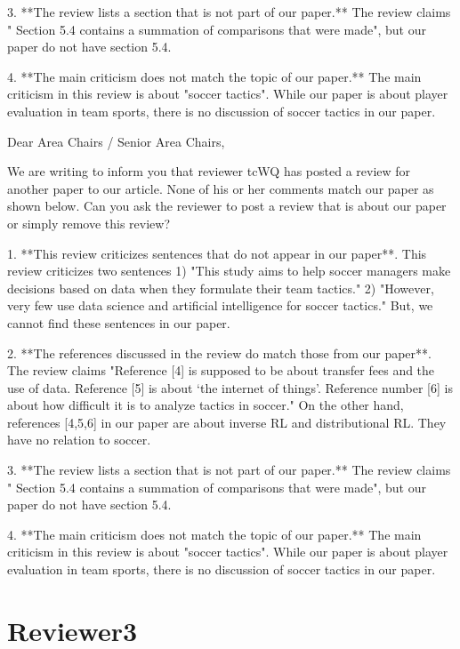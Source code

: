 \documentclass{article}
\begin{document}
3. **The review lists a section that is not part of our paper.** The review claims " Section 5.4 contains a summation of comparisons that were made", but our paper do not have section 5.4.

4. **The main criticism does not match the topic of  our paper.** The main criticism in this review is about "soccer tactics". While our paper is about player evaluation in team sports, there is no discussion of soccer tactics in our paper.

Dear Area Chairs / Senior Area Chairs,

We are writing to inform you that reviewer tcWQ has posted a review for another paper to our article. None of his or her comments match our paper as shown below.  Can you ask the reviewer to post a review that is about our paper or simply remove this review?

1. **This review criticizes sentences that do not appear in our paper**. This review criticizes two sentences 1) "This study aims to help soccer managers make decisions based on data when they formulate their team tactics." 2) "However, very few use data science and artificial intelligence for soccer tactics."  But, we cannot find these sentences in our paper.

2. **The references discussed in the review do match those from our paper**. The review claims "Reference [4] is supposed to be about transfer fees and the use of data. Reference [5] is about ‘the internet of things’. Reference number [6] is about how difficult it is to analyze tactics in soccer." On the other hand, references [4,5,6] in our paper are about inverse RL and distributional RL. They have no relation to soccer.

3. **The review lists a section that is not part of our paper.** The review claims " Section 5.4 contains a summation of comparisons that were made", but our paper do not have section 5.4.

4. **The main criticism does not match the topic of  our paper.** The main criticism in this review is about "soccer tactics". While our paper is about player evaluation in team sports, there is no discussion of soccer tactics in our paper.



\section{Reviewer3}
\end{document}
